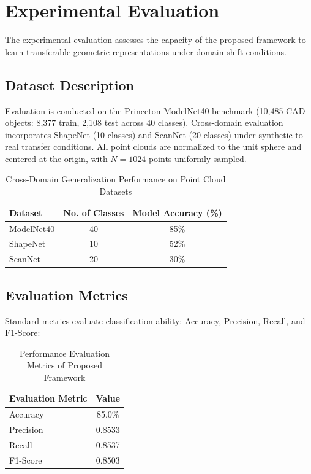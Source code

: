 \documentclass[conference]{IEEEtran}
\begin{document}
\section{Experimental Evaluation}
The experimental evaluation assesses the capacity of the proposed framework to learn transferable geometric representations under domain shift conditions.

\subsection{Dataset Description}
Evaluation is conducted on the Princeton ModelNet40 benchmark (10,485 CAD objects: 8,377 train, 2,108 test across 40 classes). Cross-domain evaluation incorporates ShapeNet (10 classes) and ScanNet (20 classes) under synthetic-to-real transfer conditions. All point clouds are normalized to the unit sphere and centered at the origin, with $N = 1024$ points uniformly sampled.

\begin{table}[htbp]
\caption{Cross-Domain Generalization Performance on Point Cloud Datasets}
\label{tab:cross_domain}
\centering
\begin{tabular}{lcc}
\toprule
\textbf{Dataset} & \textbf{No. of Classes} & \textbf{Model Accuracy (\%)} \\
\midrule
ModelNet40 & 40 & 85\% \\
ShapeNet & 10 & 52\% \\
ScanNet & 20 & 30\% \\
\bottomrule
\end{tabular}
\end{table}

\subsection{Evaluation Metrics}
Standard metrics evaluate classification ability: Accuracy, Precision, Recall, and F1-Score:

\begin{table}[htbp]
\caption{Performance Evaluation Metrics of Proposed Framework}
\label{tab:metrics_summary}
\centering
\begin{tabular}{lc}
\toprule
\textbf{Evaluation Metric} & \textbf{Value} \\
\midrule
Accuracy & 85.0\% \\
Precision & 0.8533 \\
Recall & 0.8537 \\
F1-Score & 0.8503 \\
\bottomrule
\end{tabular}
\end{table}
\end{document}
